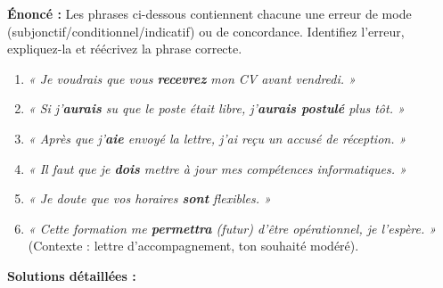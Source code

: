 \documentclass[11pt]{article}
\begin{document}
\begin{exoresolu}
\textbf{Énoncé :} Les phrases ci-dessous contiennent chacune une erreur de mode (subjonctif/conditionnel/indicatif) ou de concordance. Identifiez l'erreur, expliquez-la et réécrivez la phrase correcte.

\begin{enumerate}
    \item \emph{« Je voudrais que vous \textbf{recevrez} mon CV avant vendredi. »}
    \item \emph{« Si j'\textbf{aurais} su que le poste était libre, j'\textbf{aurais postulé} plus tôt. »}
    \item \emph{« Après que j'\textbf{aie} envoyé la lettre, j'ai reçu un accusé de réception. »}
    \item \emph{« Il faut que je \textbf{dois} mettre à jour mes compétences informatiques. »}
    \item \emph{« Je doute que vos horaires \textbf{sont} flexibles. »}
    \item \emph{« Cette formation me \textbf{permettra} (futur) d'être opérationnel, je l'espère. »} (Contexte : lettre d'accompagnement, ton souhaité modéré).
\end{enumerate}

\tcblower
\textbf{Solutions détaillées :}


\end{exoresolu}
\end{document}
